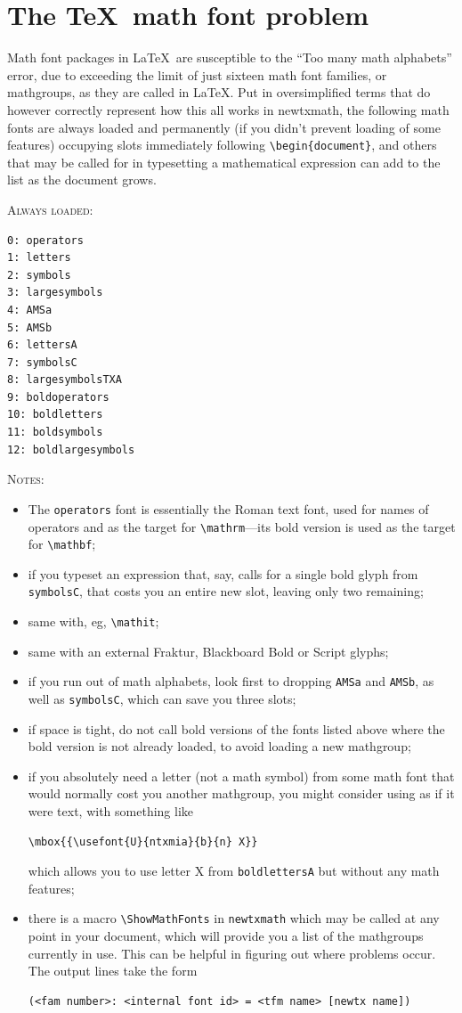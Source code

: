 \documentclass[11pt]{article}
\begin{document}
\section{The \TeX\ math font problem}
Math font packages in \LaTeX\ are susceptible to the ``Too many math alphabets'' error, due to exceeding the limit of just sixteen math font families, or mathgroups, as they are called in \LaTeX. Put in oversimplified terms that do however correctly represent how this all works in \textsf{newtxmath}, the following math fonts are always loaded and permanently (if you didn't prevent loading of some features) occupying slots immediately following \verb|\begin{document}|, and others that may be called for in typesetting a mathematical expression can add to the list as the document grows.

\textsc{Always loaded:}
\begin{verbatim}
0: operators
1: letters
2: symbols
3: largesymbols
4: AMSa
5: AMSb
6: lettersA
7: symbolsC
8: largesymbolsTXA
9: boldoperators
10: boldletters
11: boldsymbols
12: boldlargesymbols
\end{verbatim}
\textsc{Notes:}
\begin{itemize}
\item
The {\tt operators} font is essentially the Roman text font, used for names of operators and as the target for \verb|\mathrm|---its bold version is used as the target for \verb|\mathbf|;
\item if you typeset an expression that, say, calls for a single bold glyph from  {\tt symbolsC}, that costs you an entire new slot, leaving only two remaining;
\item same with, eg, \verb|\mathit|;
\item same with an external Fraktur, Blackboard Bold or Script glyphs;
\item if you run out of math alphabets, look first to dropping {\tt AMSa} and {\tt AMSb}, as well as {\tt symbolsC}, which can save you three slots;
\item if space is tight, do not call bold versions of the fonts listed above where the bold version is not already loaded, to avoid loading a new mathgroup; 
\item if you absolutely need a letter (not a math symbol) from some math font that would normally cost you another mathgroup, you might consider using as if it were text, with something like
\begin{verbatim}
\mbox{{\usefont{U}{ntxmia}{b}{n} X}}
\end{verbatim}
which allows you to use letter X from {\tt boldlettersA} but without any math features;
\item there is a macro \verb|\ShowMathFonts| in {\tt newtxmath} which may be called at any point in your document, which will provide you a list of the mathgroups currently in use. This can be helpful in figuring out where problems occur. The output lines take the form
\begin{verbatim}
(<fam number>: <internal font id> = <tfm name> [newtx name])
\end{verbatim}

\end{itemize}
\end{document}
